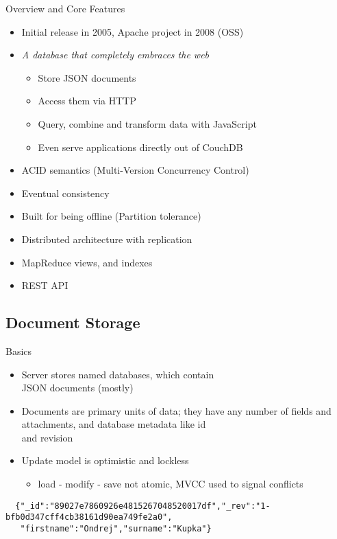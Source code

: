 \documentclass{beamer}
\begin{document}
\begin{frame}{Overview and Core Features}
  \begin{itemize}
    \item Initial release in 2005, Apache project in 2008 (OSS)
    \item \textit{A database that completely embraces the web}
    \begin{itemize}
      \item Store JSON documents
      \item Access them via HTTP
      \item Query, combine and transform data with JavaScript
      \item Even serve applications directly out of CouchDB
    \end{itemize}
    \item ACID semantics (Multi-Version Concurrency Control)
    \item Eventual consistency
    \item Built for being offline (Partition tolerance)
    \item Distributed architecture with replication
    \item MapReduce views, and indexes
    \item REST API
  \end{itemize}
\end{frame}

\subsection{Document Storage}
\begin{frame}[fragile]{Basics}
  \begin{itemize}
    \item Server stores named databases, which contain\\JSON documents (mostly)
    \item Documents are primary units of data; they have any number of fields
          and attachments, and database metadata like id\\and revision
    \item Update model is optimistic and lockless
    \begin{itemize}
      \item load - modify - save not atomic, MVCC used to signal conflicts
    \end{itemize}
  \end{itemize}
  \fontsize{6}{8}\selectfont
  \begin{verbatim}
  {"_id":"89027e7860926e4815267048520017df","_rev":"1-bfb0d347cff4cb38161d90ea749fe2a0",
   "firstname":"Ondrej","surname":"Kupka"}
  \end{verbatim}
\end{frame}
\end{document}
